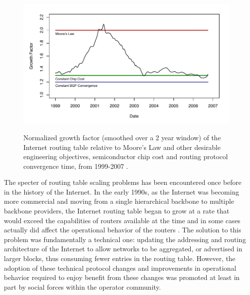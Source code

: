 \begin{figure}
\begin{center}
    \includegraphics[width=6in]{static_figures/li_relgrowth.pdf}
    \vspace{-2em}\\
    \caption[Normalized growth factor of the Internet routing table relative
    to Moore's Law]{Normalized growth factor (smoothed over a 2 year window)
    of the Internet routing table relative to Moore's Law and other desirable
    engineering objectives, semiconductor chip cost and routing protocol
    convergence time, from 1999-2007 \cite{Li:2006cr}.}
    \label{fig:li_router_scalability}
\end{center}
\end{figure}

The specter of routing table scaling problems has been encountered once before
in the history of the Internet. In the early 1990s, as the Internet was
becoming more commercial and moving from a single hierarchical backbone to
multiple backbone providers, the Internet routing table began to grow at a rate
that would exceed the capabilities of routers available at the time
\cite{Huston:2001bs} and in some cases actually did affect the operational
behavior of the routers \cite{Li:2011vn}. The solution to this problem was
fundamentally a technical one: updating the addressing and routing architecture
of the Internet to allow networks to be aggregated, or advertised in larger
blocks, thus consuming fewer entries in the routing table. However, the
adoption of these technical protocol changes and improvements in operational
behavior required to enjoy benefit from these changes was promoted at least in
part by social forces within the operator community.

